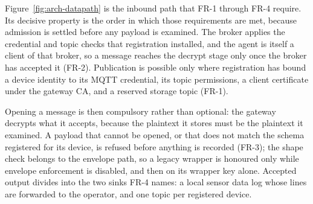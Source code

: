 \documentclass[12pt,a4paper]{report}
\begin{document}
Figure~\ref{fig:arch-datapath} is the inbound path that
FR-1 through FR-4 require. Its decisive property is the
order in which those requirements are met, because admission
is settled before any payload is examined. The broker applies
the credential and topic checks that registration installed,
and the agent is itself a client of that broker, so a message
reaches the decrypt stage only once the broker has accepted
it (FR-2). Publication is possible only where registration
has bound a device identity to its MQTT credential, its topic
permissions, a client certificate under the gateway CA, and a
reserved storage topic (FR-1).

Opening a message is then compulsory rather than optional:
the gateway decrypts what it accepts, because the plaintext
it stores must be the plaintext it examined. A payload that
cannot be opened, or that does not match the schema
registered for its device, is refused before anything is
recorded (FR-3); the shape check belongs to the envelope
path, so a legacy wrapper is honoured only while envelope
enforcement is disabled, and then on its wrapper key alone.
Accepted output divides into the two sinks FR-4 names: a
local sensor data log whose lines are forwarded to the
operator, and one topic per registered device.
\end{document}
